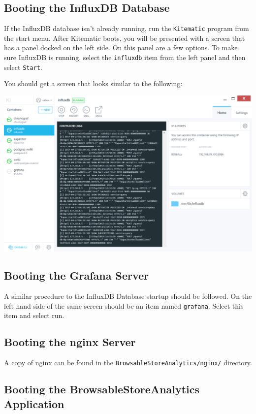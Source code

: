 \subsection{Booting the InfluxDB
Database}\label{booting-the-influxdb-database}

If the InfluxDB database isn't already running, run the
\texttt{Kitematic} program from the start menu. After Kitematic boots,
you will be presented with a screen that has a panel docked on the left
side. On this panel are a few options. To make sure InfluxDB is running,
select the \texttt{influxdb} item from the left panel and then select
\texttt{Start}.

You should get a screen that looks similar to the following:

\includegraphics[width=.8\textwidth]{gfx/kitematic.png}

\subsection{Booting the Grafana
Server}\label{booting-the-grafana-server}

A similar procedure to the InfluxDB Database startup should be followed.
On the left hand side of the same screen should be an item named
\texttt{grafana}. Select this item and select run.

\subsection{Booting the nginx Server}\label{booting-the-nginx-server}

A copy of nginx can be found in the
\texttt{BrowsableStoreAnalytics/nginx/} directory.

\subsection{Booting the BrowsableStoreAnalytics
Application}\label{booting-the-browsablestoreanalytics-application}

